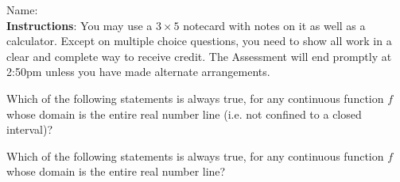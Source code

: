 \documentclass[addpoints]{exam}
\begin{document}
		
\vspace*{0pt}

\noindent
Name: \underline{\hspace{2in}} \\


\noindent
\textbf{Instructions}:  You may use a $3 \times 5$ notecard with notes on it as well as a calculator. Except on multiple choice questions, you need to show all work in a clear and complete way to receive credit. The Assessment will end promptly at 2:50pm unless you have made alternate arrangements. 

\begin{questions}


\question[2] Which of the following statements is always true, for any continuous function $f$ whose domain is the entire real number line (i.e. not confined to a closed interval)? 
	
\question[2] Which of the following statements is always true, for any continuous function $f$ whose domain is the entire real number line? 
\end{questions}
\end{document}
